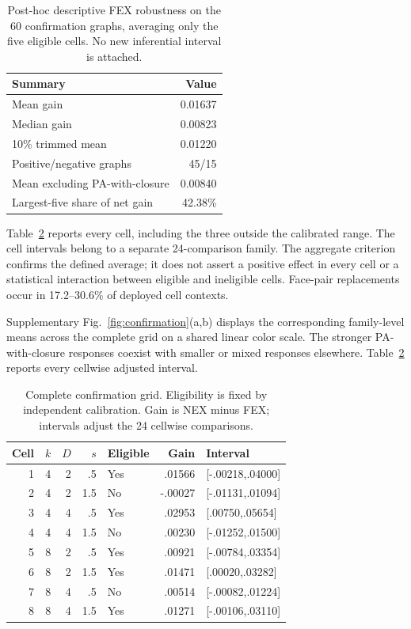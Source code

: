 \documentclass[preprint,11pt,sort&compress]{elsarticle}
\begin{document}
\begin{table}[!htbp]
\centering\small
\caption{Post-hoc descriptive FEX robustness on the 60 confirmation graphs, averaging only the five eligible cells. No new inferential interval is attached.}
\label{tab:robustness}
\begin{tabular}{lr}\toprule Summary & Value\\\midrule
Mean gain & 0.01637\\
Median gain & 0.00823\\
10\% trimmed mean & 0.01220\\
Positive/negative graphs & 45/15\\
Mean excluding PA-with-closure & 0.00840\\
Largest-five share of net gain & 42.38\%\\
\bottomrule\end{tabular}
\end{table}



Table~\ref{tab:grid} reports every cell, including the three outside the calibrated range. The cell intervals belong to a separate 24-comparison family. The aggregate criterion confirms the defined average; it does not assert a positive effect in every cell or a statistical interaction between eligible and ineligible cells. Face-pair replacements occur in 17.2--30.6\% of deployed cell contexts.

Supplementary Fig.~\ref{fig:confirmation}(a,b) displays the corresponding family-level means across the complete grid on a shared linear color scale. The stronger PA-with-closure responses coexist with smaller or mixed responses elsewhere. Table~\ref{tab:grid} reports every cellwise adjusted interval.

\begin{table}[!htbp]
\centering\small
\caption{Complete confirmation grid. Eligibility is fixed by independent calibration. Gain is NEX minus FEX; intervals adjust the 24 cellwise comparisons.}
\label{tab:grid}
\begin{tabular}{rrrrlrl}
\toprule
Cell & $k$ & $D$ & $s$ & Eligible & Gain & Interval\\
\midrule
1 & 4 & 2 & .5 & Yes & .01566 & [-.00218,.04000]\\
2 & 4 & 2 & 1.5 & No & -.00027 & [-.01131,.01094]\\
3 & 4 & 4 & .5 & Yes & .02953 & [.00750,.05654]\\
4 & 4 & 4 & 1.5 & No & .00230 & [-.01252,.01500]\\
5 & 8 & 2 & .5 & Yes & .00921 & [-.00784,.03354]\\
6 & 8 & 2 & 1.5 & Yes & .01471 & [.00020,.03282]\\
7 & 8 & 4 & .5 & No & .00514 & [-.00082,.01224]\\
8 & 8 & 4 & 1.5 & Yes & .01271 & [-.00106,.03110]\\
\bottomrule
\end{tabular}
\end{table}
\end{document}
